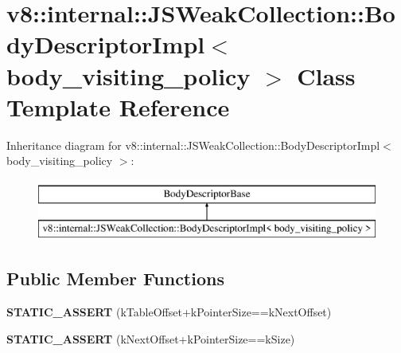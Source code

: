 \hypertarget{classv8_1_1internal_1_1_j_s_weak_collection_1_1_body_descriptor_impl}{}\section{v8\+:\+:internal\+:\+:J\+S\+Weak\+Collection\+:\+:Body\+Descriptor\+Impl$<$ body\+\_\+visiting\+\_\+policy $>$ Class Template Reference}
\label{classv8_1_1internal_1_1_j_s_weak_collection_1_1_body_descriptor_impl}
Inheritance diagram for v8\+:\+:internal\+:\+:J\+S\+Weak\+Collection\+:\+:Body\+Descriptor\+Impl$<$ body\+\_\+visiting\+\_\+policy $>$\+:\begin{figure}[H]
\begin{center}
\leavevmode
\includegraphics[height=2.000000cm]{classv8_1_1internal_1_1_j_s_weak_collection_1_1_body_descriptor_impl}
\end{center}
\end{figure}
\subsection*{Public Member Functions}
\begin{DoxyCompactItemize}
\item 
{\bfseries S\+T\+A\+T\+I\+C\+\_\+\+A\+S\+S\+E\+RT} (k\+Table\+Offset+k\+Pointer\+Size==k\+Next\+Offset)\hypertarget{classv8_1_1internal_1_1_j_s_weak_collection_1_1_body_descriptor_impl_ac056bbdf74401f21aae669dfbf065d9d}{}\label{classv8_1_1internal_1_1_j_s_weak_collection_1_1_body_descriptor_impl_ac056bbdf74401f21aae669dfbf065d9d}

\item 
{\bfseries S\+T\+A\+T\+I\+C\+\_\+\+A\+S\+S\+E\+RT} (k\+Next\+Offset+k\+Pointer\+Size==k\+Size)\hypertarget{classv8_1_1internal_1_1_j_s_weak_collection_1_1_body_descriptor_impl_a30c0470397bbc7ff636c8556ffa5aaa7}{}\label{classv8_1_1internal_1_1_j_s_weak_collection_1_1_body_descriptor_impl_a30c0470397bbc7ff636c8556ffa5aaa7}

\end{DoxyCompactItemize}

